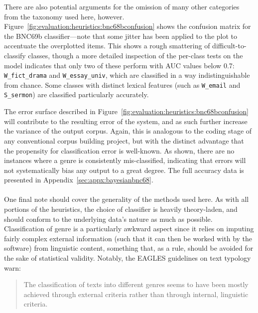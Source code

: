 There are also potential arguments for the omission of many other categories from the taxonomy used here, however.  Figure~\ref{fig:evaluation:heuristics:bnc68bconfusion} shows the confusion matrix for the BNC69b classifier---note that some jitter has been applied to the plot to accentuate the overplotted items.  This shows a rough smattering of difficult-to-classify classes, though a more detailed inspection of the per-class tests on the model indicates that only two of these perform with AUC values below 0.7: \texttt{W\_fict\_drama} and \texttt{W\_essay\_univ}, which are classified in a way indistinguishable from chance.  Some classes with distinct lexical features (such as \texttt{W\_email} and \texttt{S\_sermon}) are classified particularly accurately.

The error surface described in Figure~\ref{fig:evaluation:heuristics:bnc68bconfusion} will contribute to the resulting error of the system, and as such further increase the variance of the output corpus.  Again, this is analogous to the coding stage of any conventional corpus building project, but with the distinct advantage that the propensity for classification error is well-known.  As shown, there are no instances where a genre is consistently mis-classified, indicating that errors will not systematically bias any output to a great degree.  The full accuracy data is presented in Appendix~\ref{sec:appx:bayesianbnc68}.

\paragraph{}

One final note should cover the generality of the methods used here.  As with all portions of the heuristics, the choice of classifier is heavily theory-laden, and should conform to the underlying data's nature as much as possible.  Classification of genre is a particularly awkward aspect since it relies on imputing fairly complex external information (such that it can then be worked with by the software) from linguistic content, something that, as a rule, should be avoided for the sake of statistical validity.  Notably, the EAGLES guidelines on text typology\cite{EagTcwgCtypeaglespreliminary} warn:

\begin{quote}
The classification of texts into different genres seems to have been mostly achieved through external criteria rather than through internal, linguistic criteria.
\end{quote}

